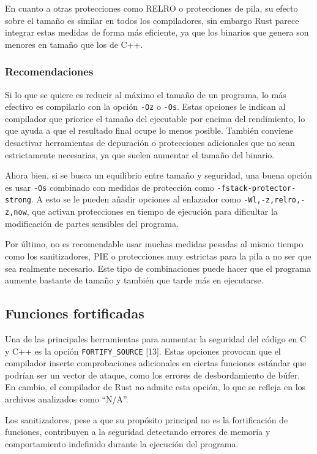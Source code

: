 En cuanto a otras protecciones como RELRO o protecciones de pila,
su efecto sobre el tamaño es similar en todos los compiladores, sin
embargo Rust parece integrar estas medidas de forma más eficiente, ya
que los binarios que genera son menores en tamaño que los de C++.

\subsubsection{\texorpdfstring{\textbf{Recomendaciones}}{Recomendaciones}}

Si lo que se quiere es reducir al máximo el tamaño de un programa, lo
más efectivo es compilarlo con la opción \texttt{-Oz} o \texttt{-Os}. Estas opciones le indican al
compilador que priorice el tamaño del ejecutable por encima del
rendimiento, lo que ayuda a que el resultado final ocupe lo menos
posible. También conviene desactivar herramientas de depuración o
protecciones adicionales que no sean estrictamente necesarias, ya que
suelen aumentar el tamaño del binario.

Ahora bien, si se busca un equilibrio entre tamaño y seguridad, una
buena opción es usar \texttt{-Os} combinado con medidas de protección
como \texttt{-fstack-protector-strong}. A esto se le pueden añadir opciones al enlazador como
\texttt{-Wl,-z,relro,-z,now}, que activan protecciones en tiempo de
ejecución para dificultar la modificación de partes sensibles del
programa.

Por último, no es recomendable usar muchas medidas pesadas al mismo
tiempo como los sanitizadores, PIE o protecciones muy
estrictas para la pila a no ser que sea realmente necesario. Este tipo
de combinaciones puede hacer que el programa aumente bastante de tamaño
y también que tarde más en ejecutarse.

\subsection{Funciones fortificadas}

Una de las principales herramientas para aumentar la seguridad del
código en C y C++ es la opción \texttt{FORTIFY\_SOURCE} [13]. Estas opciones
provocan que el compilador inserte
comprobaciones adicionales en ciertas funciones estándar que podrían ser
un vector de ataque, como los errores de desbordamiento de búfer. En
cambio, el compilador de Rust no admite esta opción, lo que se refleja
en los archivos analizados como ``N/A''.

Los sanitizadores, pese a que su propósito principal no es la
fortificación de funciones, contribuyen a la seguridad detectando
errores de memoria y comportamiento indefinido durante la ejecución del
programa.

